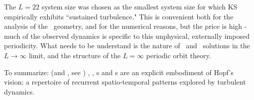 {The {\KS} $L=22$ system size was chosen as the smallest
system size for which KS empirically exhibits 
``sustained turbulence."
This is convenient both for
the analysis of the \statesp\ geometry, and for the numerical reasons,
 but the price is high - much of the
observed dynamics is specific to this unphysical, externally
imposed periodicity. What needs to be 
understand is the nature of \eqv\ and \po\ solutions in the
$L \to \infty$ limit, and the structure of the $L = \infty$ periodic orbit
theory.

To summarize: {\KS} (and \pCf, see )  \eqva, \reqva, \po s and
\rpo s are an explicit embodiment
of Hopf's vision:
a repertoire of recurrent spatio-temporal
patterns explored by turbulent dynamics.


   }
